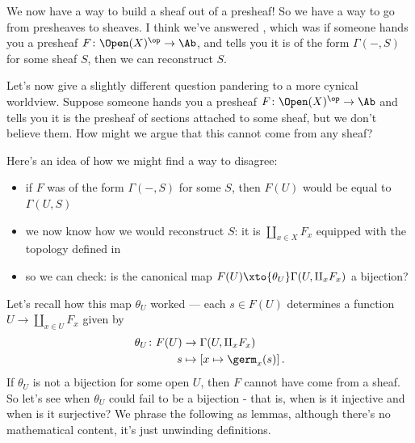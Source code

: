 \documentclass[11pt]{amsart}
\begin{document}
We now have a way to build a sheaf out of a presheaf! So we have a way to go from presheaves to sheaves. I think we've answered , which was if someone hands you a presheaf $F \colon \Open(X)^\op \to \Ab$, and tells you it is of the form $\Gamma(-,S)$ for some sheaf $S$, then we can reconstruct $S$.

Let's now give a slightly different question pandering to a more cynical worldview. Suppose someone hands you a presheaf $F \colon \Open(X)^\op \to \Ab$ and tells you it is the presheaf of sections attached to some sheaf, but we don't believe them. How might we argue that this cannot come from any sheaf?

Here's an idea of how we might find a way to disagree:
\begin{itemize}
    \item if $F$ was of the form $\Gamma(-,S)$ for some $S$, then $F(U)$ would be equal to $\Gamma(U,S)$
    \item we now know how we would reconstruct $S$: it is $\amalg_{x\in X}F_x$ equipped with the topology defined in 
    \item so we can check: is the canonical map $F(U) \xto{\theta_U} \Gamma(U, \amalg_x F_x)$ a bijection?
\end{itemize}
Let's recall how this map $\theta_U$ worked --- each $s\in F(U)$ determines a function $U \to \amalg_{x\in U}F_x$ given by
\begin{equation}\label{eqn:theta-U}
\begin{aligned}
    \theta_U \colon F(U) &\to \Gamma(U,\amalg_x F_x) \\
    s &\mapsto \left[ x \mapsto \germ_x(s) \right].
\end{aligned}
\end{equation}
If $\theta_U$ is not a bijection for some open $U$, then $F$ cannot have come from a sheaf. So let's see when $\theta_U$ could fail to be a bijection - that is, when is it injective and when is it surjective? We phrase the following as lemmas, although there's no mathematical content, it's just unwinding definitions.
\end{document}
